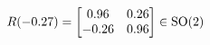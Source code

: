 \documentclass[preview]{standalone}
\begin{document}
\begin{align*}
\special{dvisvgm:raw <g id='unique000'>}R(-0.27) = \begin{bmatrix} 0.96 & 0.26 \\ -0.26 & 0.96 \end{bmatrix} \in \text{SO}(2)\special{dvisvgm:raw </g>}
\end{align*}
\end{document}
